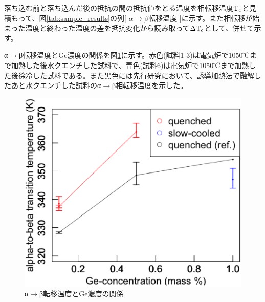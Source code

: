 落ち込む前と落ち込んだ後の抵抗の間の抵抗値をとる温度を相転移温度$\rm T_c$と見積もって、図\ref{tab:sample_results}の列[ $\alpha\to\beta$転移温度 ]に示す。また相転移が始まった温度と終わった温度の差を抵抗変化から読み取って$\rm \Delta T_c$として、併せて示す。

α$\to$β転移温度とGe濃度の関係を図\ref{fig:TransitionT}に示す。赤色(試料1-3)は電気炉で1050℃まで加熱した後水クエンチした試料で、青色(試料6)は電気炉で1050℃まで加熱した後徐冷した試料である。また黒色には先行研究\cite{Vnuk1984}において、誘導加熱法で融解したあと水クエンチした試料のα$\to$β相転移温度を示した。
\begin{figure}[!h]
    \begin{center}
   \includegraphics[width=0.6\hsize]{samples/TransitionT.eps}
  \end{center}
  \caption{α$\to$β転移温度とGe濃度の関係}
  \label{fig:TransitionT}
\end{figure}


